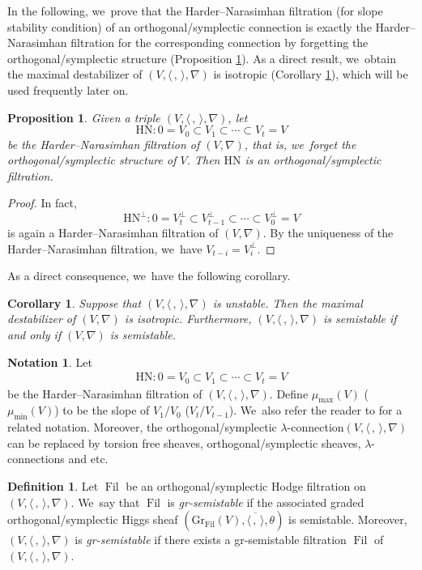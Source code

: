 \documentclass[JEP,XML,SOM,Unicode,published]{cedram}
\newcommand{\lconnection}{$\lambda$\nobreakdash-con\-nec\-tion\xspace}
\newcommand{\lconnections}{$\lambda$\nobreakdash-con\-nec\-tions\xspace}
\newcommand{\grsemistable}{gr\nobreakdash-semi\-stable\xspace}
\newcommand{\HN}{\mathrm{HN}}
\DeclareMathOperator{\Filt}{Fil}
\newcommand{\Gr}{\mathrm{Gr}}
\theoremstyle{plain}
\newtheorem{cor}[thm]{Corollary}
\newtheorem{prop}[thm]{Proposition}
\theoremstyle{definition}
\newtheorem{defn}[thm]{Definition}
\newtheorem{notn}[thm]{Notation}
\begin{document}
In the following, we~prove that the Harder--Narasimhan filtration (for slope stability condition) of an orthogonal/symplectic connection is exactly the Harder--Narasimhan filtration for the corresponding connection by forgetting the orthogonal/symplectic structure (Proposition \ref{prop_HN_fil}). As a direct result, we~obtain the maximal destabilizer of $(V, \langle \,,\, \rangle, \nabla)$ is isotropic (Corollary \ref{cor_max_destab_iso}), which will be used frequently later on.

\begin{prop}\label{prop_HN_fil}
Given a triple $(V,\langle \,, \, \rangle,\nabla)$, let
\[
\HN:0=V_0\subset V_1 \subset \cdots \subset V_t=V
\]
be the Harder--Narasimhan filtration of $(V, \nabla)$, that is, we~forget the orthogonal/symplectic structure of $V$. Then $\HN$ is an orthogonal/symplectic filtration.
\end{prop}

\begin{proof}
In fact,
\[
\HN^\perp:0=V_t^\perp\subset V_{t-1}^\perp \subset \cdots \subset V_0^\perp=V
\]
is again a Harder--Narasimhan filtration of $(V, \nabla)$. By the uniqueness of the Harder--Narasimhan filtration, we~have $V_{t-i}=V_{i}^\perp$.
\end{proof}

As a direct consequence, we~have the following corollary.
\begin{cor}\label{cor_max_destab_iso}
Suppose that $(V,\langle \,, \, \rangle,\nabla)$ is unstable. Then the maximal destabilizer of $(V, \nabla)$ is isotropic. Furthermore, $(V,\langle \,, \, \rangle,\nabla)$ is semistable if and only if $(V, \nabla)$ is semistable.
\end{cor}

\begin{notn}
Let
\begin{align*}
\HN:0=V_0\subset V_1 \subset \cdots \subset V_t=V
\end{align*}
be the Harder--Narasimhan filtration of $(V,\langle \,, \, \rangle,\nabla)$. Define $\mu_{\max}(V)$ (\resp $\mu_{\min}(V)$) to be the slope of $V_1 / V_0$ (\resp $V_t/V_{t-1}$). We~also refer the reader to \cite[Def.\,1.3.2]{HL97} for a related notation. Moreover, the orthogonal/symplectic \lconnection $(V,\langle \,, \, \rangle,\nabla)$ can be replaced by torsion free sheaves, orthogonal/symplectic sheaves, \lconnections and etc.
\end{notn}

\skpt
\begin{defn} \label{gr-semistable}
Let $\Filt$ be an orthogonal/symplectic Hodge filtration on $(V, \langle \,,\, \rangle,\nabla)$. We~say that $\Filt$ is \emph{\grsemistable} if the associated graded orthogonal/sym\-plec\-tic Higgs sheaf $(\Gr_{\Filt}(V), \overline{\langle \,, \, \rangle},\theta)$ is semistable. Moreover, $(V, \langle \,, \, \rangle, \nabla)$ is \emph{\grsemistable} if there exists a \grsemistable filtration $\Filt$ of $(V, \langle \,,\, \rangle,\nabla)$.
\end{defn}
\end{document}
